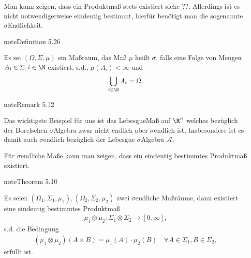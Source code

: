 \documentclass[letterpaper,10pt,german]{jupyterBook}
\begin{document}
\sphinxAtStartPar
Man kann zeigen, dass ein Produktmaß stets existiert siehe ??. Allerdings ist es nicht notwendigerweise eindeutig bestimmt, hierfür benötigt man die sogenannte \(\sigma\)\sphinxhyphen{}Endlichkeit.
\label{masstheorie/integrationstechnik:definition-9}
\begin{sphinxadmonition}{note}{Definition 5.26}



\sphinxAtStartPar
Es sei \((\Omega,\Sigma,\mu)\) ein Maßraum, das Maß \(\mu\) heißt \(\sigma\), falls eine Folge von Mengen \(A_i\in\Sigma,i\in\N\) existiert, s.d., \(\mu(A_i)<\infty\) und
\begin{equation*}
\begin{split}\bigcup_{i\in\N} A_i = \Omega.\end{split}
\end{equation*}\end{sphinxadmonition}
\label{masstheorie/integrationstechnik:remark-10}
\begin{sphinxadmonition}{note}{Remark 5.12}



\sphinxAtStartPar
Das wichtigste Beispiel für uns ist das Lebesgue\sphinxhyphen{}Maß auf \(\R^n\) welches bezüglich der Borelschen \(\sigma\)\sphinxhyphen{}Algebra zwar nicht endlich aber \(\sigma\)\sphinxhyphen{}endlich ist. Insbesondere ist es damit auch \(\sigma\)\sphinxhyphen{}endlich bezüglich der Lebesgue \(\sigma\)\sphinxhyphen{}Algebra \(\mathcal{A}\).
\end{sphinxadmonition}

\sphinxAtStartPar
Für \(\sigma\)\sphinxhyphen{}endliche Maße kann man zeigen, dass ein eindeutig bestimmtes Produktmaß existiert.
\label{masstheorie/integrationstechnik:theorem-11}
\begin{sphinxadmonition}{note}{Theorem 5.10}



\sphinxAtStartPar
Es seien \((\Omega_1,\Sigma_1,\mu_1), (\Omega_2,\Sigma_2,\mu_2)\) zwei \(\sigma\)\sphinxhyphen{}endliche Maßräume, dann existiert eine eindeutig bestimmtes Produktmaß
\begin{equation*}
\begin{split}\mu_1\otimes \mu_2:\Sigma_1\otimes\Sigma_2\to[0,\infty],\end{split}
\end{equation*}
\sphinxAtStartPar
s.d. die Bedingung
\begin{equation*}
\begin{split}(\mu_1\otimes\mu_2)(A\times B) = \mu_1(A)\cdot\mu_2(B)\quad\forall A\in\Sigma_1, B\in\Sigma_2,\end{split}
\end{equation*}
\sphinxAtStartPar
erfüllt ist.
\end{sphinxadmonition}
\end{document}
